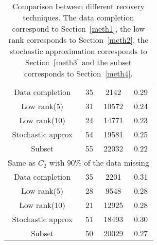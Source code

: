 \documentclass[12pt]{article}
\begin{document}
\begin{table}
\begin{center}
\begin{tabular}{|cccc|}
\hline
Data completion    &       35                &             2142                        &     0.29          \\
Low rank(5)            &        31            &              10572                   &        0.24       \\
Low rank(10)          &         24           &              14771                    &        0.23       \\
Stochastic approx  &       54             &             19581                    &      0.25         \\
Subset                     &       55            &              22032                    &       0.22        \\
\hline
\multicolumn{4}{|c|}{Same as $C_{2}$ with $90\%$ of the data missing} \\
\hline
Data completion    &       35                &             2201                        &     0.31          \\
Low rank(5)            &        28            &               9548                   &        0.28       \\
Low rank(10)          &         21           &              12925                    &        0.28       \\
Stochastic approx  &       51             &             18493                    &      0.30         \\
Subset                     &       50            &              20029                    &       0.27        \\
\hline
\end{tabular}
\caption{Comparison between different recovery techniques. The data completion
correspond to Section~\ref{meth1}, the low rank corresponds to Section~\ref{meth2}, the
stochastic approximation corresponds to Section~\ref{meth3} and the subset corresponds to Section~\ref{meth4}.}
 \label{tab1}
\end{center}
\end{table}
\end{document}
